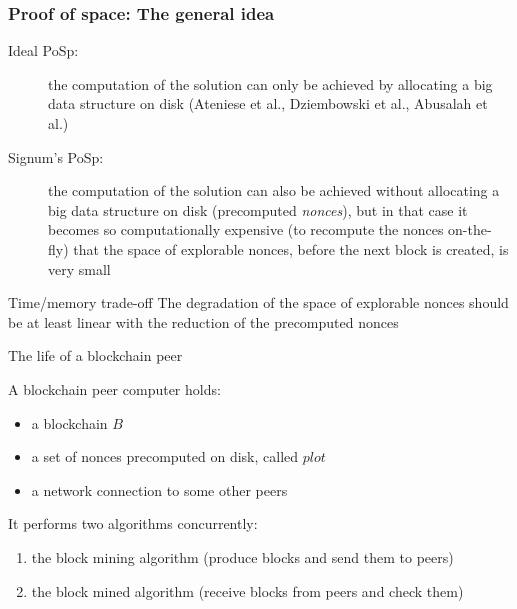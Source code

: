 \documentclass[11pt]{beamer}  %
\newcommand{\plot}{{\mathit{plot}}}
\begin{document}
\begin{frame}\frametitle{Proof of space: The general idea}

  \begin{description}
  \item[Ideal PoSp:] the computation of the solution can only be achieved by allocating
    a big data structure on disk (Ateniese et al., Dziembowski et al., Abusalah et al.)
    \medskip
  \item[Signum's PoSp:] the computation of the solution can also be achieved without
    allocating a big data structure on disk (precomputed \emph{nonces}),
    but in that case it becomes so
    computationally expensive (to recompute the nonces on-the-fly)
    that the space of explorable nonces, before the next block is created, is very small
  \end{description}

  \bigskip
  
  \begin{redbox}{Time/memory trade-off}
    The degradation of the space of explorable nonces should be at least linear with
    the reduction of the precomputed nonces
  \end{redbox}

\end{frame}

\begin{frame}{The life of a blockchain peer}

  A blockchain peer computer holds:
  \begin{itemize}
  \item a blockchain $B$
  \item a set of nonces precomputed on disk, called $\plot$
  \item a network connection to some other peers
  \end{itemize}

  \bigskip
  \pause
  It performs two algorithms concurrently:
  \begin{enumerate}
    \pause
  \item the block mining algorithm (produce blocks and send them to peers)
    \pause
  \item the block mined algorithm (receive blocks from peers and check them)
  \end{enumerate}

\end{frame}
\end{document}
